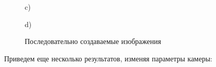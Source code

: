 \documentclass[14pt,a4paper,report]{report}
\begin{document}
\begin{figure}[h!]
\begin{minipage}[h]{0.47\linewidth}
 c) \\
\end{minipage}
\hfill
\begin{minipage}[h]{0.47\linewidth}
 d) \\
\end{minipage}
\caption{Последовательно создаваемые изображения}
\label{ris:experimentalcorrelationsignals}
\end{figure}

Приведем еще несколько результатов, изменяя параметры камеры:
\end{document}

